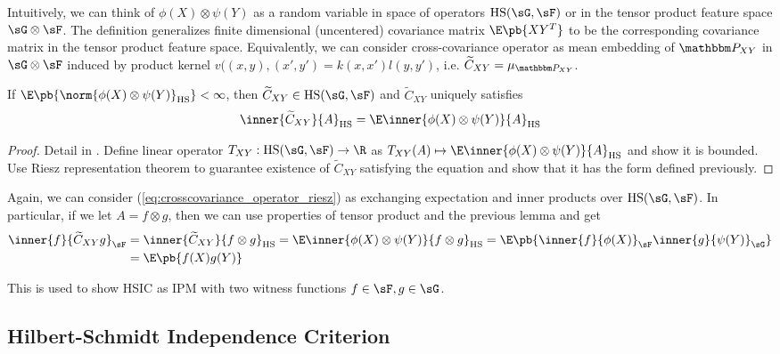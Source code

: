 \documentclass[11pt]{article}
\begin{document}
Intuitively, we can think of $\phi(X)\otimes \psi(Y)$ as a random variable in space of operators $\text{HS}(\sG,\sF)$ or in the tensor product feature space $\sG\otimes \sF$. The definition generalizes finite dimensional (uncentered) covariance matrix $\E\pb{XY^T}$ to be the corresponding covariance matrix in the tensor product feature space. Equivalently, we can consider cross-covariance operator as mean embedding of $\bbP_{XY}$ in $\sG\otimes\sF$ induced by product kernel $v((x,y),(x',y') = k(x,x')l(y,y')$, i.e. $\widetilde{C}_{XY} = \mu_{\bbP_{XY}}$. 

\begin{lemma}
    If $\E\pb{\norm{\phi(X)\otimes \psi(Y)}_{\text{HS}}} < \infty$, then $\widetilde{C}_{XY}\in\text{HS}(\sG,\sF)$ and $\widetilde{C}_{XY}$ uniquely satisfies
    \begin{align}
        \label{eq:crosscovariance_operator_riesz}
        \inner{\widetilde{C}_{XY}}{A}_{\text{HS}} 
            = \E\inner{\phi(X)\otimes \psi(Y)}{A}_{\text{HS}}
    \end{align}
\end{lemma}

\begin{proof}
    Detail in \cite{grettonNotesMeanEmbeddings2019}. Define linear operator $T_{XY}: \text{HS}(\sG,\sF) \to\R$ as $T_{XY}(A) \mapsto \E\inner{\phi(X)\otimes \psi(Y)}{A}_{\text{HS}}$ and show it is bounded. Use Riesz representation theorem to guarantee existence of $\widetilde{C}_{XY}$ satisfying the equation and show that it has the form defined previously.
\end{proof}

Again, we can consider (\ref{eq:crosscovariance_operator_riesz}) as exchanging expectation and inner products over $\text{HS}(\sG,\sF)$. In particular, if we let $A=f\otimes g$, then we can use properties of tensor product and the previous lemma and get
\begin{align}
    \inner{f}{\widetilde{C}_{XY}g}_{\sF}
        &= \inner{\widetilde{C}_{XY}}{f\otimes g}_{\text{HS}} 
        = \E\inner{\phi(X)\otimes\psi(Y)}{f\otimes g}_{\text{HS}} 
        = \E\pb{ \inner{f}{\phi(X)}_{\sF} \inner{g}{\psi(Y)}_{\sG} } \\
        &= \E\pb{ f(X)g(Y) }
\end{align}

This is used to show HSIC as IPM with two witness functions $f\in\sF,g\in\sG$.


\subsection{Hilbert-Schmidt Independence Criterion}
\end{document}
